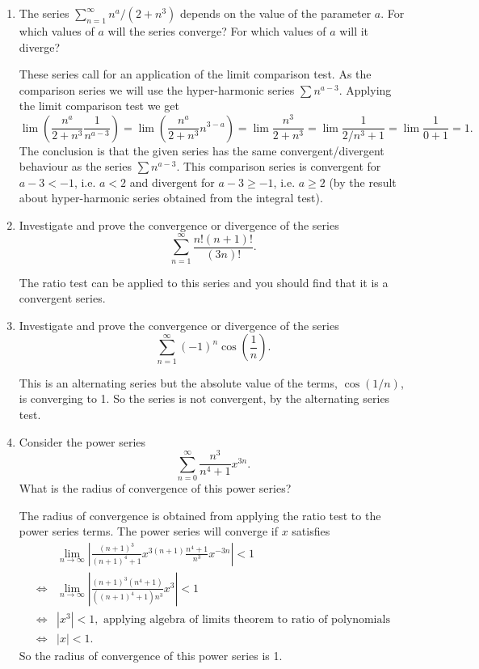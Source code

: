 \documentclass[oneside,10pt]{memoir}
\begin{document}
{\begin{enumerate}
\item
The series $\sum_{n=1}^\infty n^a / (2+n^3)$ depends on the value of the parameter $a$. For which values of $a$ will the series converge? For which values of $a$ will it diverge?

\begin{solution}
These series call for an application of the limit comparison test. As the comparison series we will use the hyper-harmonic series $\sum n^{a-3}$. Applying the limit comparison test we get
$$\lim \left ( \frac{n^a}{2+n^3} \frac{1}{n^{a-3}} \right ) = \lim \left ( \frac{n^a}{2+n^3} n^{3-a} \right ) = \lim \frac{n^3}{2+n^3} = \lim \frac{1}{2/n^3 + 1} = \lim \frac{1}{0+1} = 1.$$
The conclusion is that the given series has the same convergent/divergent behaviour as the series $\sum n^{a-3}$. This comparison series is convergent for $a-3 < -1$, i.e. $a < 2$ and divergent for $a-3 \geq -1$, i.e. $a \geq 2$ (by the result about hyper-harmonic series obtained from the integral test).
\end{solution}



\item
Investigate and prove the convergence or divergence of the series
$$\sum_{n=1}^\infty \frac{n! (n+1)!}{(3n)!}.$$
\begin{solution}
The ratio test can be applied to this series and you should find that it is a convergent series.
\end{solution}

\item
Investigate and prove the convergence or divergence of the series
$$\sum_{n=1}^\infty (-1)^n \cos \left ( \frac{1}{n} \right ).$$
\begin{solution}
This is an alternating series but the absolute value of the terms, $\cos(1/n)$, is converging to 1. So the series is not convergent, by the alternating series test.
\end{solution}

\item
Consider the power series
$$\sum_{n=0}^\infty \frac{n^3}{n^4 +1} x^{3n}.$$
What is the radius of convergence of this power series?
\begin{solution}
The radius of convergence is obtained from applying the ratio test to the power series terms. The power series will converge if $x$ satisfies
\begin{align*}
&\lim_{n \to \infty} \left | \frac{(n+1)^3}{(n+1)^4 +1} x^{3(n+1)} \frac{n^4+1}{n^3} x^{-3n} \right |
 < 1\\
 \Leftrightarrow &\lim_{n \to \infty} \left | \frac{(n+1)^3(n^4+1)}{((n+1)^4 +1)n^3} x^{3} \right |
 < 1\\
 \Leftrightarrow & |x^3|<1, \text{ applying algebra of limits theorem to ratio of polynomials} \\
 \Leftrightarrow & |x| < 1.
\end{align*}
So the radius of convergence of this power series is 1.
\end{solution}


\end{enumerate}}
\end{document}
